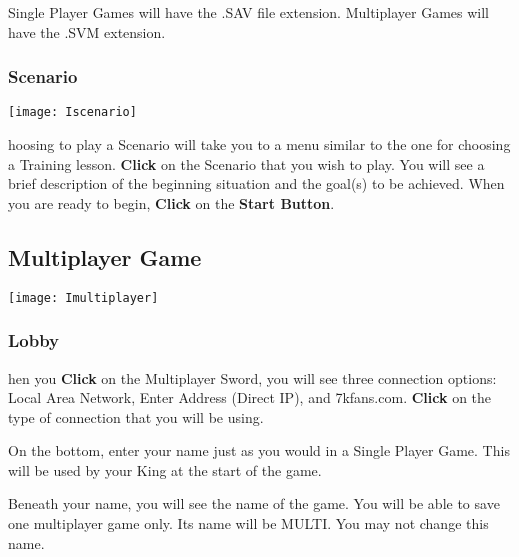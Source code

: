 
Single Player Games will have the .SAV file extension. Multiplayer Games will have the .SVM extension.

\subsubsection{Scenario}


\begin{center}
	\texttt{[image: Iscenario]} %
\end{center}

hoosing to play a Scenario will take you to a menu similar to the one for choosing a Training lesson. \textbf{Click} on the Scenario that you wish to play. You will see a brief description of the beginning situation and the goal(s) to be achieved. When you are ready to begin, \textbf{Click} on the \textbf{Start Button}.

\subsection{Multiplayer Game}



\begin{center}
	\texttt{[image: Imultiplayer]} %
\end{center}

\subsubsection{Lobby} %

hen you \textbf{Click} on the Multiplayer Sword, you will see three connection options: Local Area Network, Enter Address (Direct IP), and 7kfans.com. \textbf{Click} on the type of connection that you will be using.

On the bottom, enter your name just as you would in a Single Player Game. This will be used by your King at the start of the game.

Beneath your name, you will see the name of the game. You will be able to save one multiplayer game only. Its name will be MULTI. You may not change this name.

